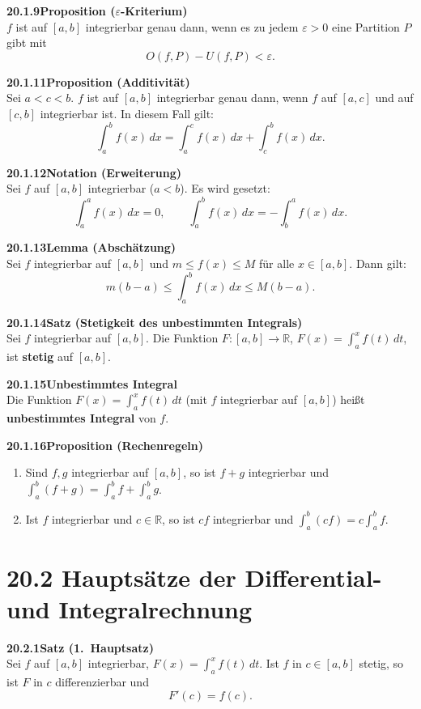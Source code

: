 \documentclass[a4paper,12pt]{article}
\newcommand{\gentry}[3]{%
  \noindent\textbf{#1\quad #2}\nopagebreak\\[0.2em]
  #3\par\smallskip
}
\begin{document}
\gentry{20.1.9}{Proposition ($\varepsilon$-Kriterium)}{%
  $f$ ist auf $[a,b]$ integrierbar genau dann, wenn es zu jedem $\varepsilon > 0$
  eine Partition $P$ gibt mit
  \[
    O(f,P) - U(f,P) < \varepsilon.
  \]
}

\gentry{20.1.11}{Proposition (Additivität)}{%
  Sei $a < c < b$. $f$ ist auf $[a,b]$ integrierbar genau dann, wenn $f$ auf
  $[a,c]$ und auf $[c,b]$ integrierbar ist. In diesem Fall gilt:
  \[
    \int_a^b f(x)\,dx = \int_a^c f(x)\,dx + \int_c^b f(x)\,dx.
  \]
}

\gentry{20.1.12}{Notation (Erweiterung)}{%
  Sei $f$ auf $[a,b]$ integrierbar ($a < b$). Es wird gesetzt:
  \[
    \int_a^a f(x)\,dx = 0, \qquad \int_a^b f(x)\,dx = -\int_b^a f(x)\,dx.
  \]
}

\gentry{20.1.13}{Lemma (Abschätzung)}{%
  Sei $f$ integrierbar auf $[a,b]$ und $m \le f(x) \le M$ für alle $x \in [a,b]$.
  Dann gilt:
  \[
    m(b-a) \le \int_a^b f(x)\,dx \le M(b-a).
  \]
}

\gentry{20.1.14}{Satz (Stetigkeit des unbestimmten Integrals)}{%
  Sei $f$ integrierbar auf $[a,b]$. Die Funktion
  $F : [a,b] \to \mathbb{R}$,\; $F(x) = \int_a^x f(t)\,dt$,
  ist \textbf{stetig} auf $[a,b]$.
}

\gentry{20.1.15}{Unbestimmtes Integral}{%
  Die Funktion $F(x) = \int_a^x f(t)\,dt$ (mit $f$ integrierbar auf $[a,b]$)
  heißt \textbf{unbestimmtes Integral} von $f$.
}

\gentry{20.1.16}{Proposition (Rechenregeln)}{%
  \begin{enumerate}[label=\arabic*.,topsep=2pt,itemsep=1pt]
    \item Sind $f,g$ integrierbar auf $[a,b]$, so ist $f+g$ integrierbar und
          $\int_a^b (f+g) = \int_a^b f + \int_a^b g$.
    \item Ist $f$ integrierbar und $c \in \mathbb{R}$, so ist $cf$ integrierbar und
          $\int_a^b (cf) = c \int_a^b f$.
  \end{enumerate}
}

\section*{20.2 \quad Hauptsätze der Differential- und Integralrechnung}

\gentry{20.2.1}{Satz (1.\ Hauptsatz)}{%
  Sei $f$ auf $[a,b]$ integrierbar, $F(x) = \int_a^x f(t)\,dt$.
  Ist $f$ in $c \in [a,b]$ stetig, so ist $F$ in $c$ differenzierbar und
  \[
    F'(c) = f(c).
  \]
}
\end{document}
